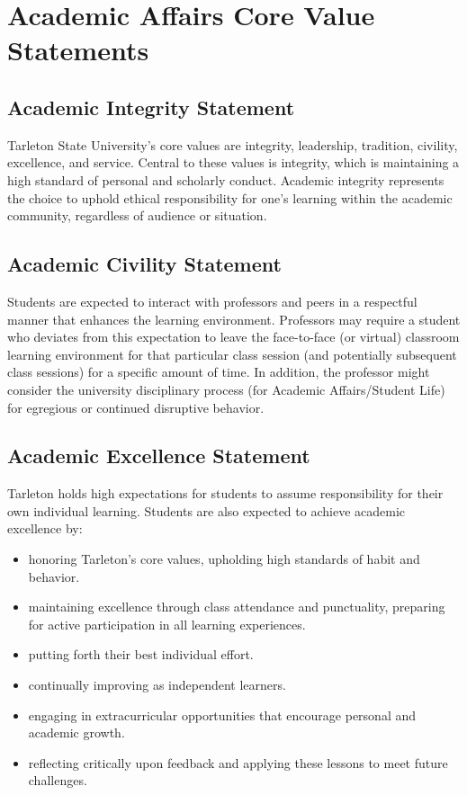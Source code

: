 \documentclass[10pt]{article}
\begin{document}
\section*{Academic Affairs Core Value Statements}
\label{sec:orge852fd7}
\subsection*{Academic Integrity Statement}
\label{sec:org5e60bd3}
Tarleton State University's core values are integrity, leadership, tradition, civility, excellence, and service.  Central to these values is integrity, which is maintaining a high standard of personal and scholarly conduct.  Academic integrity represents the choice to uphold ethical responsibility for one’s learning within the academic community, regardless of audience or situation.

\subsection*{Academic Civility Statement}
\label{sec:org83e8e41}
Students are expected to interact with professors and peers in a respectful manner that enhances the learning environment. Professors may require a student who deviates from this expectation to leave the face-to-face (or virtual) classroom learning environment for that particular class session (and potentially subsequent class sessions) for a specific amount of time. In addition, the professor might consider the university disciplinary process (for Academic Affairs/Student Life) for egregious or continued disruptive behavior.

\subsection*{Academic Excellence Statement}
\label{sec:org1a4ad11}
Tarleton holds high expectations for students to assume responsibility for their own individual learning. Students are also expected to achieve academic excellence by:
\begin{itemize}
\item honoring Tarleton’s core values, upholding high standards of habit and behavior.
\item maintaining excellence through class attendance and punctuality, preparing for active participation in all learning experiences.
\item putting forth their best individual effort.
\item continually improving as independent learners.
\item engaging in extracurricular opportunities that encourage personal and academic growth.
\item reflecting critically upon feedback and applying these lessons to meet future challenges.
\end{itemize}
\end{document}
